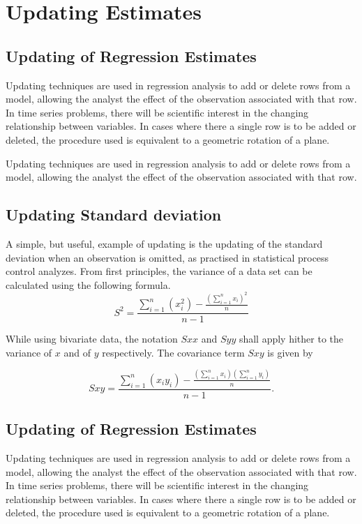 \documentclass[12pt, a4paper]{article}
\begin{document}
\newpage
\section{Updating Estimates} %

\subsection{Updating of Regression Estimates}
Updating techniques are used in regression analysis to add or delete rows from a model, allowing the analyst the effect of the observation associated with that row. In time series problems, there will be scientific interest in the changing relationship between variables. In cases where there a single row is to be added or deleted, the procedure used is equivalent to a geometric rotation of a plane.

Updating techniques are used in regression analysis to add or delete rows from a model, allowing the analyst the effect of the observation associated with that row.

\subsection{Updating Standard deviation}
A simple, but useful, example of updating is the updating of the standard deviation when an observation is omitted, as practised in statistical process control analyzes. From first principles, the variance of a data set can be calculated using the following formula.
\begin{equation}
S^{2}=\frac{\sum_{i=1}^{n}(x_{i}^{2})-\frac{(\sum_{i=1}^{n}x_{i})^{2}}{n}}{n-1}
\end{equation}

While using bivariate data, the notation $Sxx$ and $Syy$ shall apply hither to the variance of $x$ and of $y$ respectively. The covariance term $Sxy$ is given by

\begin{equation}
Sxy=\frac{\sum_{i=1}^{n}(x_{i}y_{i})-\frac{(\sum_{i=1}^{n}x_{i})(\sum_{i=1}^{n}y_{i})}{n}}{n-1}.
\end{equation}

\subsection{Updating of Regression Estimates}
Updating techniques are used in regression analysis to add or
delete rows from a model, allowing the analyst the effect of the
observation associated with that row. In time series problems,
there will be scientific interest in the changing relationship
between variables. In cases where there a single row is to be
added or deleted, the procedure used is equivalent to a geometric
rotation of a plane.
\end{document}
